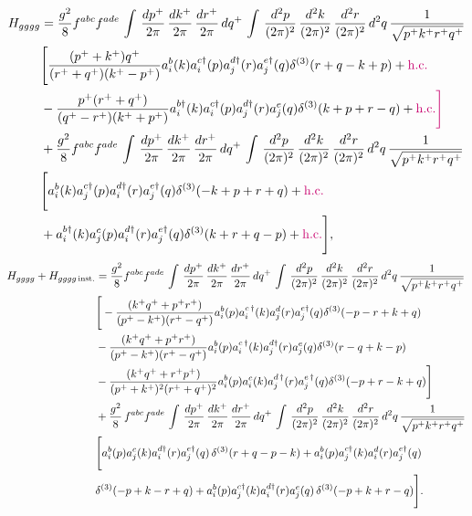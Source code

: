 \documentclass[a4paper,11pt]{article}
\begin{document}
\begin{align} \label{eq:H_g-ggg}
    H_{gggg} & = \frac{g^{2}}{8} f^{abc}f^{ade}\, \int\, \frac{dp^{+}}{2\pi}\, \frac{dk^{+}}{2\pi}\, \frac{dr^{+}}{2\pi}\, dq^{+}\, \int\, \frac{d^{2}p}{(2\pi)^{2}}\, \frac{d^{2}k}{(2\pi)^{2}}\, \frac{d^{2}r}{(2\pi)^{2}}\, d^{2}q\,\frac{1}{\sqrt{p^{+}k^{+}r^{+}q^{+}}} \notag \\ & \Bigg[\frac{(p^{+}+k^{+})q^{+}}{(r^{+}+q^{+})(k^{+}-p^{+})}a^{b}_{i}(k)a^{c\dagger}_{i}(p)a^{d\dagger}_{j}(r)a^{e\dagger}_{j}(q) \delta^{(3)}(r+q-k+p) + {\color{chg}{\rm h.c.}} \notag \\ & - \frac{p^{+}(r^{+}+q^{+})}{(q^{+}-r^{+})(k^{+}+p^{+})}a^{b\dagger}_{i}(k)a^{c\dagger}_{i}(p)a^{d\dagger}_{j}(r)a^{e}_{j}(q)\delta^{(3)}(k+p+r-q)+ {\color{chg}{\rm h.c.}\Bigg]}\notag \\ & +\frac{g^{2}}{8} f^{abc}f^{ade}\, \int\, \frac{dp^{+}}{2\pi}\, \frac{dk^{+}}{2\pi}\, \frac{dr^{+}}{2\pi}\, dq^{+}\, \int\, \frac{d^{2}p}{(2\pi)^{2}}\, \frac{d^{2}k}{(2\pi)^{2}}\, \frac{d^{2}r}{(2\pi)^{2}}\, d^{2}q\,\frac{1}{\sqrt{p^{+}k^{+}r^{+}q^{+}}}\notag \\ & \Bigg[a^{b}_{i}(k)a^{c\dagger}_{j}(p)a^{d\dagger}_{i}(r)a^{e\dagger}_{j}(q) \delta^{(3)}(-k+p+r+q)+ {\color{chg}{\rm h.c.}}\notag \\ & +a^{b\dagger}_{i}(k)a^{c}_{j}(p)a^{d\dagger}_{i}(r)a^{e\dagger}_{j}(q)\delta^{(3)}(k+r+q-p)+ {\color{chg}{\rm h.c.}}\Bigg],
\end{align}
\begin{align} \label{eq:H_gg-gg}
    H_{gggg}+H_{gggg\,\text{inst.}} & = \frac{g^{2}}{8} f^{abc}f^{ade}\, \int\, \frac{dp^{+}}{2\pi}\, \frac{dk^{+}}{2\pi}\, \frac{dr^{+}}{2\pi}\, dq^{+}\, \int\, \frac{d^{2}p}{(2\pi)^{2}}\, \frac{d^{2}k}{(2\pi)^{2}}\, \frac{d^{2}r}{(2\pi)^{2}}\, d^{2}q\,\frac{1}{\sqrt{p^{+}k^{+}r^{+}q^{+}}} \notag \\ & \Bigg[-\frac{(k^{+}q^{+}+p^{+}r^{+})}{(p^{+}-k^{+})(r^{+}-q^{+})}a^{b}_{i}(p)a^{c\,\dagger}_{i}(k)a^{d}_{j}(r)a^{e\dagger}_{j}(q)\delta^{(3)}(-p-r+k+q) \notag \\ & -\frac{(k^{+}q^{+}+p^{+}r^{+})}{(p^{+}-k^{+})(r^{+}-q^{+})} a^{b}_{i}(p)a^{c\,\dagger}_{i}(k)a^{d\dagger}_{j}(r)a^{e}_{j}(q) \delta^{(3)}(r-q+k-p)\notag \\ & -\frac{(k^{+}q^{+}+r^{+}p^{+})}{(p^{+}+k^{+})^{2}(r^{+}+q^{+})^{2}}a^{b}_{i}(p)a^{c}_{i}(k)a^{d\,\dagger}_{j}(r)a^{e\,\dagger}_{j}(q)\delta^{(3)}(-p+r-k+q)\Bigg]\notag \\ & 
    + \frac{g^{2}}{8}\, f^{abc}f^{ade}\,\int\, \frac{dp^{+}}{2\pi}\, \frac{dk^{+}}{2\pi}\, \frac{dr^{+}}{2\pi}\, dq^{+}\, \int\, \frac{d^{2}p}{(2\pi)^{2}}\, \frac{d^{2}k}{(2\pi)^{2}}\, \frac{d^{2}r}{(2\pi)^{2}}\, d^{2}q\,\frac{1}{\sqrt{p^{+}k^{+}r^{+}q^{+}}} \notag \\ & \Bigg[a^{b}_{i}(p)a^{c}_{j}(k)a^{d\dagger}_{i}(r)a^{e\dagger}_{j}(q)\,\delta^{(3)}(r+q-p-k) + a^{b}_{i}(p)a^{c\dagger}_{j}(k)a^{d}_{i}(r)a^{e\dagger}_{j}(q)\notag \\ &  \delta^{(3)}(-p+k-r+q) +a^{b}_{i}(p)a^{c\dagger}_{j}(k)a^{d\dagger}_{i}(r)a^{e}_{j}(q)\, \delta^{(3)}(-p+k+r-q)\Bigg].
\end{align}
\end{document}
